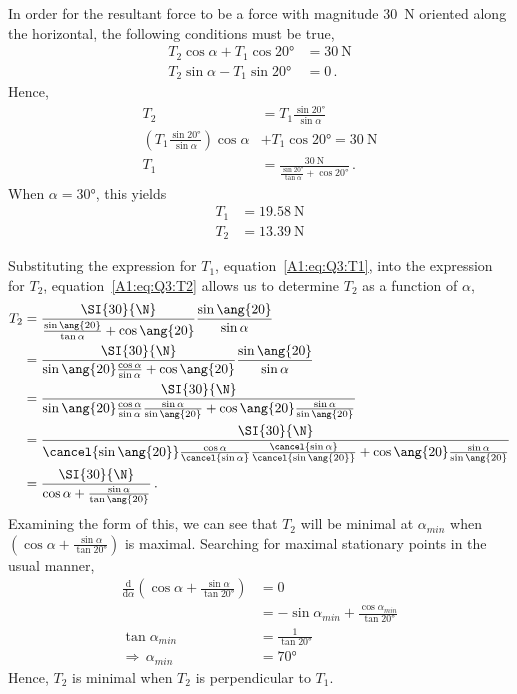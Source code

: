 In order for the resultant force to be a force with magnitude \SI{30}{\N} oriented along the horizontal, the following conditions must be true,
\begin{align}
	T_2 \cos\alpha + T_1 \cos\ang{20} &= \SI{30}{\N}	\\
	T_2 \sin\alpha - T_1 \sin\ang{20} &= 0 \,.
\end{align}
Hence,
\begin{align}
	T_2	&=	T_1\frac{\sin\ang{20}}{\sin\alpha}	\label{A1:eq:Q3:T1}\\
	\left(	T_1 \frac{\sin\ang{20}}{\sin\alpha}	\right) \cos\alpha &+ T_1\cos\ang{20} = \SI{30}{\N}	\nonumber \\
	T_1	&=	\frac{\SI{30}{\N}}{\frac{\sin\ang{20}}{\tan\alpha} + \cos\ang{20}}	\,. \label{A1:eq:Q3:T2}
\end{align}
When $\alpha=\ang{30}$, this yields
\begin{align*}
	T_1&=\SI{19.58}{\N}\\
	T_2&=\SI{13.39}{\N}
\end{align*}

Substituting the expression for $T_1$, equation~\ref{A1:eq:Q3:T1}, into the expression for $T_2$, equation~\ref{A1:eq:Q3:T2} allows us to determine $T_2$ as a function of $\alpha$,
\begin{align}
	T_2	&=\frac{\SI{30}{\N}}{\frac{\sin\ang{20}}{\tan\alpha} + \cos\ang{20}}	\frac{\sin\ang{20}}{\sin\alpha}	\nonumber	\\
		&=\frac{\SI{30}{\N}}	{\sin\ang{20}\frac{\cos\alpha}{\sin\alpha} + \cos\ang{20}}	\frac{\sin\ang{20}}{\sin\alpha}	\nonumber \\
		&=\frac{\SI{30}{\N}}	{\sin\ang{20}\frac{\cos\alpha}{\sin\alpha}\frac{\sin\alpha}{\sin\ang{20}} + \cos\ang{20}\frac{\sin\alpha}{\sin\ang{20}}}	\nonumber \\
		&=\frac{\SI{30}{\N}}	{\cancel{\sin\ang{20}}	\frac{\cos\alpha}	{\cancel{\sin\alpha}}	\frac{\cancel{\sin\alpha}}{\cancel{\sin\ang{20}}} + \cos\ang{20}\frac{\sin\alpha}{\sin\ang{20}}}	\nonumber \\
		&=\frac{\SI{30}{\N}}{\cos\alpha + \frac{\sin\alpha}{\tan\ang{20}}} \,.
\end{align}
Examining the form of this, we can see that $T_2$ will be minimal at $\alpha_{min}$ when $\left(\cos\alpha + \frac{\sin\alpha}{\tan\ang{20}}\right)$ is maximal. Searching for maximal stationary points in the usual manner,
\begin{align}
	\frac{\mathrm{d}}{\mathrm{d}\alpha} \left(\cos\alpha + \frac{\sin\alpha}{\tan\ang{20}}\right)	&=	0	\nonumber\\
		&=	-\sin\alpha_{min} +\frac{\cos\alpha_{min}}{\tan\ang{20}}	\nonumber	\\
		\tan\alpha_{min}	&=	\frac{1}{\tan\ang{20}}	\label{A1:eq:Q3:alpha}\\
		\Rightarrow\,\alpha_{min} &= \ang{70} \nonumber
\end{align}
Hence, $T_2$ is minimal when $T_2$ is perpendicular to $T_1$.
\clearpage